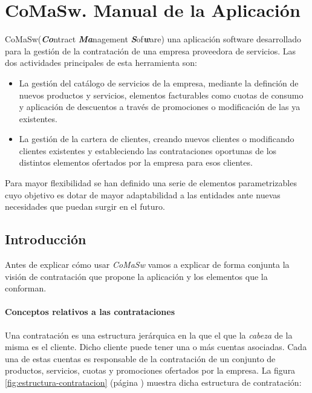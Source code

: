 \chapter{CoMaSw. Manual de la Aplicación}
\label{chap:manual}

\lettrine{CoMaSw} (\emph{\textbf{Co}}ntract \emph{\textbf{Ma}}nagement \emph{\textbf{S}}of\emph{\textbf{w}}are) una aplicación software desarrollado para la gestión de la contratación de una empresa proveedora de servicios. Las dos actividades principales de esta herramienta son:

\begin{itemize}
\item La gestión del catálogo de servicios de la empresa, mediante la definción de nuevos productos y servicios, elementos facturables como cuotas de consumo y aplicación de descuentos a través de promociones o modificación de las ya existentes.
\item La gestión de la cartera de clientes, creando nuevos clientes o modificando clientes existentes y estableciendo las contrataciones oportunas de los distintos elementos ofertados por la empresa para esos clientes.
\end{itemize}

Para mayor flexibilidad se han definido una serie de elementos parametrizables cuyo objetivo es dotar de mayor adaptabilidad a las entidades ante nuevas necesidades que puedan surgir en el futuro.


\section{Introducción}
\label{sec:introduccion}

Antes de explicar cómo usar \emph{CoMaSw} vamos a explicar de forma conjunta la visión de contratación que propone la aplicación y los elementos que la conforman.



\subsubsection{Conceptos relativos a las contrataciones}
\label{sub:contratacion-conceptos}

Una contratación es una estructura jerárquica en la que el que la \textit{cabeza} de la misma es el cliente. Dicho cliente puede tener una o más cuentas asociadas. Cada una de estas cuentas es responsable de la contratación de un conjunto de productos, servicios, cuotas y promociones ofertados por la empresa. La figura \ref{fig:estructura-contratacion} (página \pageref{fig:estructura-contratacion}) muestra dicha estructura de contratación:

